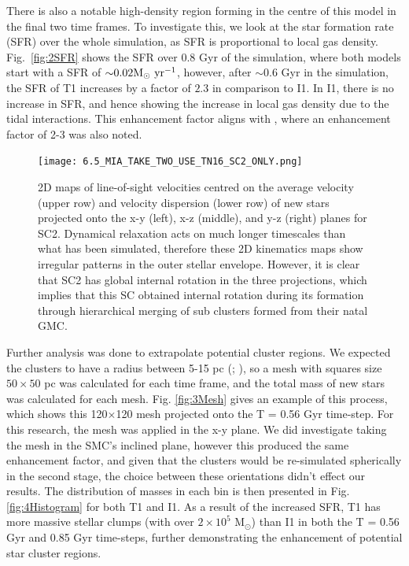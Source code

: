 \documentclass[fleqn,usenatbib]{mnras}
\begin{document}
There is also a notable high-density region forming in the centre of this model in the final two time frames. To investigate this, we look at the star formation rate (SFR) over the whole simulation, as SFR is proportional to local gas density. 
Fig.~\ref{fig:2SFR} shows the SFR over 0.8 Gyr of the simulation, where both models start with a SFR of ${\sim} 0.02 \rm{M}_{\odot} \ yr^{-1}$, however, after ${\sim}0.6$ Gyr in the simulation, the SFR of T1 increases by a factor of $2.3$ in comparison to I1.
In I1, there is no increase in SFR, and hence showing the increase in local gas density due to the tidal interactions. This enhancement factor aligns with \cite{21Bergvall_Laurikainen_Aalto2003}, where an enhancement factor of 2-3 was also noted.\newline

\begin{figure}
 \texttt{[image: 6.5\_MIA\_TAKE\_TWO\_USE\_TN16\_SC2\_ONLY.png]}
 \caption{2D maps of line-of-sight velocities centred on the average velocity (upper row) and velocity dispersion (lower row) of new stars projected onto the x-y (left), x-z (middle), and y-z (right) planes for SC2.
 Dynamical relaxation acts on much longer timescales than what has been simulated, therefore these 2D kinematics maps show irregular patterns in the outer stellar envelope. However, it is clear that SC2 has global internal rotation in the three projections, which implies that this SC obtained internal rotation during its formation through hierarchical merging of sub clusters formed from their natal GMC.}
 \label{fig:10Rotation}
\end{figure}

Further analysis was done to extrapolate potential cluster regions. We expected the clusters to have a radius between 5-15 pc  (\citealt{4Boutloukos_Lamers2003}; \citealt{11Bitsakis_et_al2018}), so a mesh with squares size $50\times 50$ pc was calculated for each time frame, and the total mass of new stars %
was calculated for each mesh. Fig. \ref{fig:3Mesh} gives an example of this process, which shows this 120$\times$120 mesh projected onto the T = 0.56 Gyr time-step. For this research, the mesh was applied in the x-y plane. We did investigate taking the mesh in the SMC's inclined plane, however this produced the same enhancement factor, and given that the clusters would be re-simulated spherically in the second stage, the choice between these orientations didn't effect our results. The distribution of masses in each bin is then presented in Fig. \ref{fig:4Histogram} for both T1 and I1. As a result of the increased SFR, T1 has more massive stellar clumps (with over $2\times 10^5$ $\text{M}_{\odot}$) than I1 in both the T = 0.56 Gyr and 0.85 Gyr time-steps, further demonstrating the enhancement of potential star cluster regions.
\end{document}
